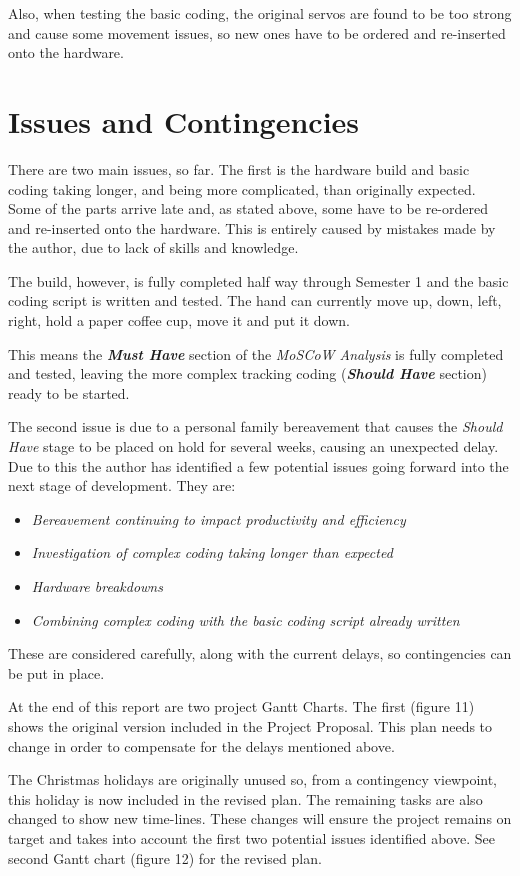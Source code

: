 \documentclass[progress]{cmpreport}
\begin{document}
{{{{{{Also, when testing the basic coding, the original servos are found to be too strong and cause some movement issues, so new ones have to be ordered and re-inserted onto the hardware. 

\section{Issues and Contingencies}
There are two main issues, so far. The first is the hardware build and basic coding taking longer, and being more complicated, than originally expected. Some of the parts arrive late and, as stated above, some have to be re-ordered and re-inserted onto the hardware. This is entirely caused by mistakes made by the author, due to lack of skills and knowledge. 

The build, however, is fully completed half way through Semester 1 and the basic coding script is written and tested. The hand can currently move up, down, left, right, hold a paper coffee cup, move it and put it down. 

This means the \textbf{\textit{Must Have}} section of the \textit{MoSCoW Analysis} is fully completed and tested, leaving the more complex tracking coding (\textbf{\textit{Should Have}} section) ready to be started. 

The second issue is due to a personal family bereavement that causes the \textit{Should Have} stage to be placed on hold for several weeks, causing an unexpected delay. Due to this the author has identified a few potential issues going forward into the next stage of development. They are:
\begin{itemize}		
	\item \textit{Bereavement continuing to impact productivity and efficiency}
	\item \textit{Investigation of complex coding taking longer than expected}
	\item \textit{Hardware breakdowns}
	\item \textit{Combining complex coding with the basic coding script already written}
\end{itemize}
These are considered carefully, along with the current delays, so contingencies can be put in place. 

At the end of this report are two project Gantt Charts. The first (figure 11) shows the original version included in the Project Proposal. This plan needs to change in order to compensate for the delays mentioned above. 

The Christmas holidays are originally unused so, from a contingency viewpoint, this holiday is now included in the revised plan. The remaining tasks are also changed to show new time-lines. These changes will ensure the project remains on target and takes into account the first two potential issues identified above. See second Gantt chart (figure 12) for the revised plan. 

}}}}}}
\end{document}
